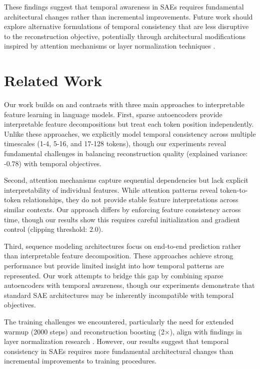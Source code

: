 \documentclass{article} %
\begin{document}
These findings suggest that temporal awareness in SAEs requires fundamental architectural changes rather than incremental improvements. Future work should explore alternative formulations of temporal consistency that are less disruptive to the reconstruction objective, potentially through architectural modifications inspired by attention mechanisms \cite{vaswani2017attention} or layer normalization techniques \cite{ba2016layer}.

\section{Related Work}
\label{sec:related}

Our work builds on and contrasts with three main approaches to interpretable feature learning in language models. First, sparse autoencoders \cite{karpathy2023nanogpt} provide interpretable feature decompositions but treat each token position independently. Unlike these approaches, we explicitly model temporal consistency across multiple timescales (1-4, 5-16, and 17-128 tokens), though our experiments reveal fundamental challenges in balancing reconstruction quality (explained variance: -0.78) with temporal objectives.

Second, attention mechanisms \cite{vaswani2017attention} capture sequential dependencies but lack explicit interpretability of individual features. While attention patterns reveal token-to-token relationships, they do not provide stable feature interpretations across similar contexts. Our approach differs by enforcing feature consistency across time, though our results show this requires careful initialization and gradient control (clipping threshold: 2.0).

Third, sequence modeling architectures \cite{bahdanau2014neural} focus on end-to-end prediction rather than interpretable feature decomposition. These approaches achieve strong performance but provide limited insight into how temporal patterns are represented. Our work attempts to bridge this gap by combining sparse autoencoders with temporal awareness, though our experiments demonstrate that standard SAE architectures may be inherently incompatible with temporal objectives.

The training challenges we encountered, particularly the need for extended warmup (2000 steps) and reconstruction boosting (2$\times$), align with findings in layer normalization research \cite{ba2016layer}. However, our results suggest that temporal consistency in SAEs requires more fundamental architectural changes than incremental improvements to training procedures.
\end{document}
